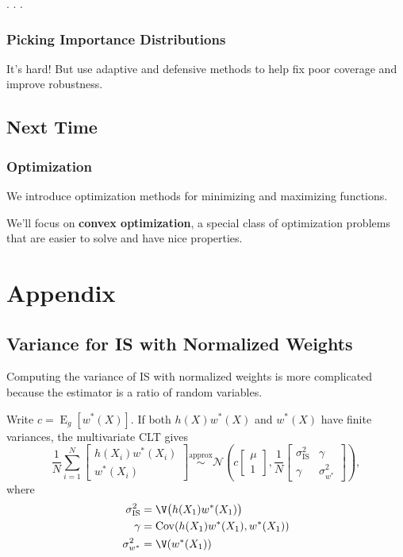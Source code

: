 \documentclass[
  letterpaper,
  DIV=11,
  numbers=noendperiod]{scrartcl}
\begin{document}
. . .

\subsubsection{Picking Importance
Distributions}\label{picking-importance-distributions}

It's hard! But use adaptive and defensive methods to help fix poor
coverage and improve robustness.

\subsection{Next Time}\label{next-time}

\subsubsection{Optimization}\label{optimization}

We introduce optimization methods for minimizing and maximizing
functions.

\medskip\pause

We'll focus on \textbf{convex optimization}, a special class of
optimization problems that are easier to solve and have nice properties.

\lectureappendix

\section{Appendix}\label{appendix}

\subsection{Variance for IS with Normalized
Weights}\label{variance-for-is-with-normalized-weights-1}

Computing the variance of IS with normalized weights is more complicated
because the estimator is a \alert{ratio of random variables}.

\medskip\pause

Write \(c = \operatorname{E}_g[w^*(X)]\). If both \(h(X)w^*(X)\) and
\(w^*(X)\) have finite variances, the multivariate CLT gives \[
  \frac{1}{N} \sum_{i=1}^N \begin{bmatrix} h(X_i) w^*(X_i) \\ w^*(X_i) \end{bmatrix}
  \overset{\mathrm{approx}}{\sim}
  \mathcal{N}\left(
    c \begin{bmatrix} \mu \\ 1\end{bmatrix},
    \frac{1}{N} \begin{bmatrix} \sigma^{2}_{\mathrm{IS}} & \gamma \\ \gamma & \sigma^2_{w^*} \end{bmatrix}
  \right),
\] where \[
\begin{aligned}
  \sigma^2_{\mathrm{IS}} & = \V \big(h(X_1) w^*(X_1)\big) \\
  \gamma & = \mathop{\mathrm{Cov}}(h(X_1) w^*(X_1), w^*(X_1)) \\
  \sigma^2_{w^*} & = \V (w^*(X_1))
\end{aligned}
\]
\end{document}
